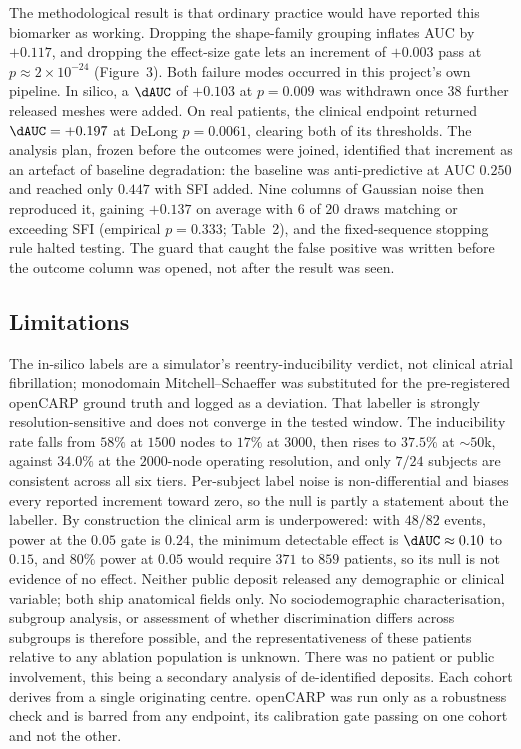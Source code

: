 The methodological result is that ordinary practice would have reported this
biomarker as working. Dropping the shape-family grouping inflates AUC by
$+0.117$, and dropping the effect-size gate lets an increment of $+0.003$ pass at
$p\approx2\times10^{-24}$ (Figure~3). Both failure modes occurred in this
project's own pipeline. In silico, a $\dAUC$ of $+0.103$ at
$p=0.009$ was withdrawn once $38$ further released meshes were added. On real
patients, the clinical endpoint returned $\dAUC=+0.197$ at DeLong $p=0.0061$,
clearing both of its thresholds. The analysis plan, frozen before the outcomes
were joined, identified that increment as an artefact of baseline degradation:
the baseline was anti-predictive at AUC $0.250$ and reached only $0.447$ with SFI
added. Nine columns of Gaussian noise then reproduced it, gaining $+0.137$ on
average with $6$ of $20$ draws matching or exceeding SFI (empirical $p=0.333$;
Table~2), and the fixed-sequence stopping rule halted testing. The guard that
caught the false positive was written before the outcome column was opened, not
after the result was seen.

\subsection*{Limitations}

The in-silico labels are a simulator's reentry-inducibility verdict,
not clinical atrial fibrillation; monodomain Mitchell--Schaeffer was substituted
for the pre-registered openCARP ground truth and logged as a deviation. That
labeller is strongly resolution-sensitive and does not converge in the tested
window. The inducibility rate falls from $58\%$ at $1500$ nodes to $17\%$ at
$3000$, then rises to $37.5\%$ at $\sim\!50$k, against $34.0\%$ at the
$2000$-node operating resolution, and only $7/24$ subjects are consistent
across all six tiers. Per-subject label noise is non-differential and biases every
reported increment toward zero, so the null is partly a statement about the
labeller. By construction the clinical arm is underpowered: with $48/82$ events,
power at the $0.05$ gate is $0.24$, the minimum detectable effect is
$\dAUC\approx0.10$ to $0.15$, and $80\%$ power at $0.05$ would require $371$ to
$859$ patients, so its null is not evidence of no effect. Neither public deposit
released any demographic or clinical variable; both ship anatomical fields only.
No sociodemographic characterisation, subgroup analysis, or assessment of
whether discrimination differs across subgroups is therefore possible, and the
representativeness of these patients relative to any ablation population is
unknown. There was no patient or public involvement, this being a secondary
analysis of de-identified deposits. Each cohort derives from a single
originating centre. openCARP was run only as a robustness check and is barred
from any endpoint, its calibration gate passing on one cohort and not the other.

